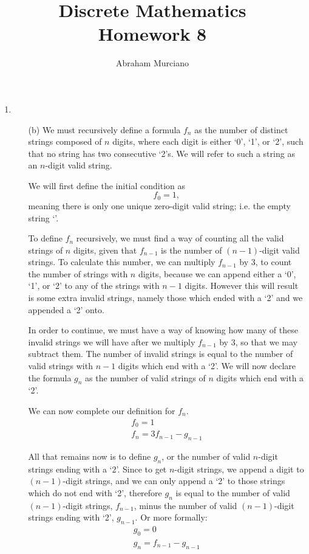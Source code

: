 \documentclass[fleqn]{article}
\title{Discrete Mathematics \\
\medskip
\large Homework 8}
\author{Abraham Murciano}
\newenvironment{answers}{ %
	\begin{enumerate}
		\setlength{\itemsep}{\bigskipamount}
}{\end{enumerate}}
\begin{document}
\maketitle

\begin{answers}

	\item
	\begin{enumerate}
		\item[(b)]
		We must recursively define a formula \(f_{n}\) as the number of distinct strings composed of \(n\) digits, where each digit is either `0', `1', or `2', such that no string has two consecutive `2's. We will refer to such a string as an \(n\)-digit valid string.

		We will first define the initial condition as
		\[f_{0} = 1,\]
		meaning there is only one unique zero-digit valid string; i.e. the empty string `'.

		To define \(f_{n}\) recursively, we must find a way of counting all the valid strings of \(n\) digits, given that \(f_{n-1}\) is the number of \((n-1)\)-digit valid strings. To calculate this number, we can multiply \(f_{n-1}\) by 3, to count the number of strings with \(n\) digits, because we can append either a `0', `1', or `2' to any of the strings with \(n-1\) digits. However this will result is some extra invalid strings, namely those which ended with a `2' and we appended a `2' onto.

		In order to continue, we must have a way of knowing how many of these invalid strings we will have after we multiply \(f_{n-1}\) by 3, so that we may subtract them. The number of invalid strings is equal to the number of valid strings with \(n-1\) digits which end with a `2'. We will now declare the formula \(g_{n}\) as the number of valid strings of \(n\) digits which end with a `2'.

		We can now complete our definition for \(f_{n}\).
		\begin{gather*}
			f_{0} = 1 \\
			f_{n} = 3f_{n-1} - g_{n-1}
		\end{gather*}

		All that remains now is to define \(g_{n}\), or the number of valid \(n\)-digit strings ending with a `2'. Since to get \(n\)-digit strings, we append a digit to \((n-1)\)-digit strings, and we can only append a `2' to those strings which do not end with `2', therefore \(g_{n}\) is equal to the number of valid \((n-1)\)-digit strings, \(f_{n-1}\), minus the number of valid \((n-1)\)-digit strings ending with `2', \(g_{n-1}\). Or more formally:
		\begin{gather*}
			g_{0} = 0 \\
			g_{n} = f_{n-1} - g_{n-1}
		\end{gather*}
	\end{enumerate}


\end{answers}
\end{document}
